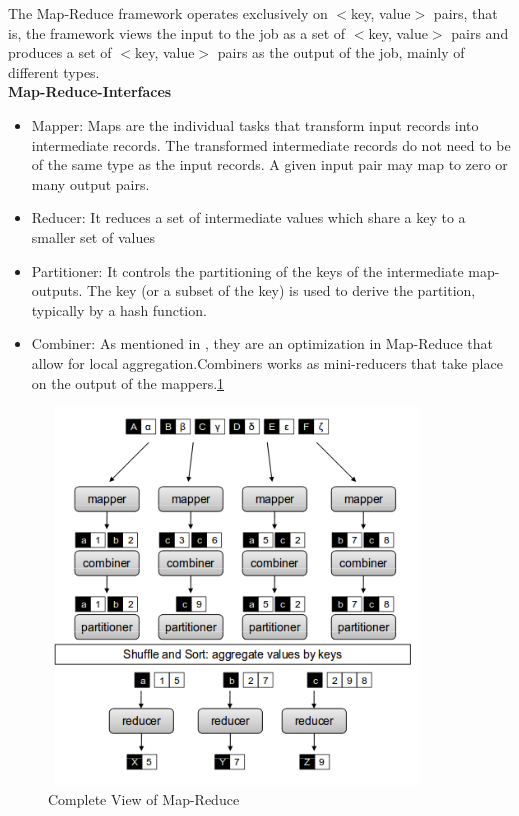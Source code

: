 \documentclass[12pt]{book}
\begin{document}
The Map-Reduce framework operates exclusively on $<$key, value$>$ pairs, that is, the framework views the input to the
job as a set of $<$key, value$>$ pairs and produces a set of $<$key, value$>$ pairs as the output of the job, 
mainly of different types.\\
\newline
\newline
\textbf{Map-Reduce-Interfaces}
\begin{itemize}
 \item Mapper: Maps are the individual tasks that transform input records into
 intermediate records. The transformed intermediate records do not need to be of the same type as the input records. 
 A given input pair may map to zero or many output pairs.
 \item Reducer: It reduces a set of intermediate values which share a key to a smaller set of values
 \item Partitioner: It controls the partitioning of the keys of the intermediate
 map-outputs. The key (or a subset of the key) is used to derive the partition, typically by a hash function.
 \item Combiner: As mentioned in \cite{PNC}, they are an optimization in Map-Reduce that allow for local
 aggregation.Combiners works as mini-reducers that take place on the output of the mappers.\ref{fig1mapred}
\end{itemize}
\begin{figure}[t]
 \centering
 \includegraphics[height=10cm,width=10cm]{./mapper.png}
 \caption{Complete View of Map-Reduce\label{fig1mapred} \cite{PNC}}
\end{figure}
\end{document}
